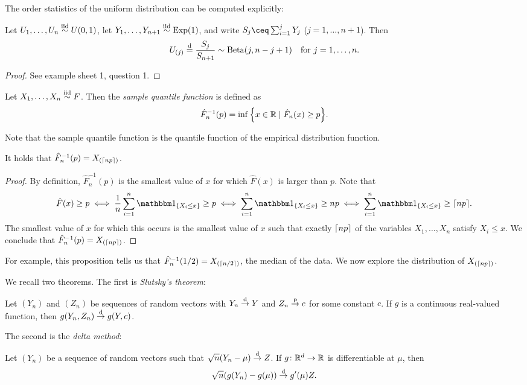 The order statistics of the uniform distribution can be computed explicitly: 
\begin{proposition}
    Let $U_1, \dotsc, U_n \overset{\mathrm{iid}}{\sim} U(0, 1)$,  let $Y_1, \dotsc, Y_{n+1} \overset{\mathrm{iid}}{\sim} \operatorname{Exp}(1)$, and write $S_j \ceq \sum_{i=1}^j Y_j$ ($j = 1, \dotsc, n+1$). Then
    \[
    U_{(j)} \overset{\mathrm{d}}= \frac{S_j}{S_{n+1}} \sim \mathrm{Beta}(j, n - j + 1) \quad\text{for $j = 1, \dotsc, n$}. 
    \]
\end{proposition}

\begin{proof}
    See example sheet 1, question 1.  
\end{proof}
\begin{definition}
    Let $X_1, \dotsc, X_n \overset{\mathrm{iid}}{\sim} F$. Then the \emph{sample quantile function} is defined as 
    \[
    \hat F_n^{-1}(p) = \inf \qty{x \in \mathbb R\mid \hat F_n(x) \geq p}. 
    \]
\end{definition}
Note that the sample quantile function is the quantile function of the empirical distribution function. 

\begin{proposition}
    It holds that $\hat F_n^{-1}(p) = X_{(\lceil np\rceil)}$. 
\end{proposition}

\begin{proof}
    By definition, $\hat F_n^{-1}(p)$ is the smallest value of $x$ for which $\hat F(x)$ is larger than $p$. Note that
    \[
    \hat F(x) \geq p \iff \frac1n \sum_{i=1}^n \ind_\qty{X_i \leq x} \geq p \iff \sum_{i=1}^n \ind_\qty{X_i \leq x} \geq np \iff \sum_{i=1}^n \ind_\qty{X_i \leq x} \geq \ceil{np}.
    \]
    The smallest value of $x$ for which this occurs is the smallest value of $x$ such that exactly $\lceil np\rceil$ of the variables $X_1, \dotsc, X_n$ satisfy $X_i \leq x$. We conclude that $\hat F_n^{-1}(p) = X_{(\lceil np\rceil)}$. 
\end{proof}

For example, this proposition tells us that $\hat F_n^{-1}(1/2) = X_{(\lceil n/2\rceil)}$, the median of the data. We now explore the distribution of $X_{(\lceil np\rceil)}$. 

\begin{recap}
We recall two theorems. The first is \emph{Slutsky's theorem}:
\begin{theorem}
    Let $(Y_n)$ and $(Z_n)$ be sequences of random vectors with $Y_n \overset{\mathrm{d}}{\to} Y$ and $Z_n \overset{\mathrm{p}}{\to} c$ for some constant $c$. If $g$ is a continuous real-valued function, then $g(Y_n, Z_n) \overset{\mathrm{d}}{\to} g(Y, c)$. 
\end{theorem}

The second is the \emph{delta method}:
\begin{theorem}
    Let $(Y_n)$ be a sequence of random vectors such that $\sqrt n (Y_n - \mu) \overset{\mathrm{d}}{\to} Z$. If $g \colon \mathbb R^d \to \mathbb R$ is differentiable at $\mu$, then
    \[
    \sqrt n \qty(g(Y_n) - g(\mu)) \overset{\mathrm{d}}{\to} g'(\mu) Z. 
    \]
\end{theorem}
\end{recap}

